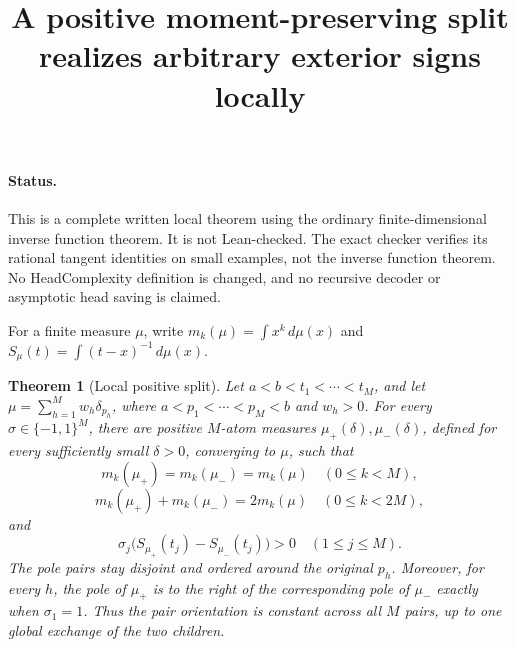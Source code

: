 \documentclass[11pt]{article}
\title{A positive moment-preserving split realizes arbitrary exterior signs locally}
\author{}\date{}
\newtheorem{theorem}{Theorem}
\begin{document}
\maketitle
\paragraph{Status.}
This is a complete written local theorem using the ordinary finite-dimensional
inverse function theorem. It is not Lean-checked. The exact checker verifies
its rational tangent identities on small examples, not the inverse function
theorem. No HeadComplexity definition is changed, and no recursive decoder
or asymptotic head saving is claimed.

For a finite measure $\mu$, write
$m_k(\mu)=\int x^k\,d\mu(x)$ and
$S_\mu(t)=\int(t-x)^{-1}\,d\mu(x)$.

\begin{theorem}[Local positive split]
Let $a<b<t_1<\cdots<t_M$, and let
$\mu=\sum_{h=1}^M w_h\delta_{p_h}$, where
$a<p_1<\cdots<p_M<b$ and $w_h>0$.
For every $\sigma\in\{-1,1\}^M$, there are positive $M$-atom
measures $\mu_+(\delta),\mu_-(\delta)$, defined for every sufficiently
small $\delta>0$, converging to $\mu$, such that
\[
 m_k(\mu_+)=m_k(\mu_-)=m_k(\mu)\quad(0\leq k<M),
\]
\[
 m_k(\mu_+)+m_k(\mu_-)=2m_k(\mu)\quad(0\leq k<2M),
\]
and
\[
 \sigma_j\bigl(S_{\mu_+}(t_j)-S_{\mu_-}(t_j)\bigr)>0
 \quad(1\leq j\leq M).
\]
The pole pairs stay disjoint and ordered around the original $p_h$.
Moreover, for every $h$, the pole of $\mu_+$ is to the right of the
corresponding pole of $\mu_-$ exactly when $\sigma_1=1$.
Thus the pair orientation is constant across all $M$ pairs, up to one
global exchange of the two children.
\end{theorem}
\end{document}

